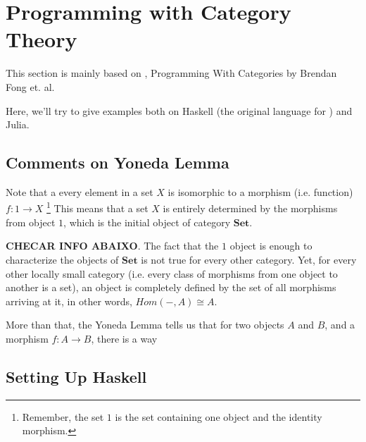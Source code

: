 \newpage
\section{Programming with Category Theory}

This section is mainly based on \citet{milewski2018category},
Programming With Categories by Brendan Fong et. al.

Here, we'll try to give examples both on Haskell
(the original language for \citet{milewski2018category})
and Julia.

\subsection{Comments on Yoneda Lemma}

Note that a every element in a set $X$ is isomorphic to
a morphism (i.e. function) $f: 1 \to X$
\footnote{Remember, the set $1$ is the set
containing one object and the identity morphism.}
This means that a set $X$ is entirely determined by
the morphisms from object $1$, which is the initial
object of category $\mathbf{Set}$.


\textbf{CHECAR INFO ABAIXO}.
The fact that the $1$ object is enough to characterize the
objects of $\mathbf{Set}$ is not true for every other category.
Yet, for every other locally small category
(i.e. every class of morphisms from one object to another is a set),
an object is completely defined by the set of all morphisms arriving at it,
in other words, $Hom(-, A) \cong A$.

More than that, the Yoneda Lemma tells us that for
two objects $A$ and $B$, and a morphism $f:A\to B$, there
is a way 

\subsection{Setting Up Haskell}




